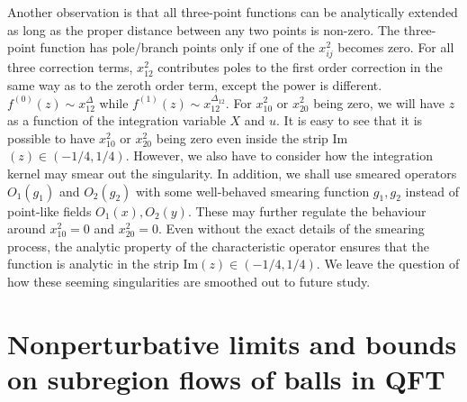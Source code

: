 \documentclass[a4paper,11pt]{article}
\theoremstyle{definition}
\begin{document}
Another observation is that all three-point functions can be analytically extended as long as the proper distance between any two points is non-zero. The three-point function has pole/branch points only if one of the $x_{ij}^2$ becomes zero. For all three correction terms, $x_{12}^2$ contributes poles to the first order correction in the same way as to the zeroth order term, except the power is different. $f^{(0)}(z) \sim x_{12}^{\Delta}$ while $f^{(1)}(z) \sim x_{12}^{\Delta_{12}}$. For $x_{10}^2 $ or $ x_{20}^2$ being zero, we will have $z$ as a function of the integration variable $X$ and $u$. It is easy to see that it is possible to have $x_{10}^2 $ or $ x_{20}^2$ being zero even inside the strip Im$(z) \in (-1/4,1/4)$. However, we also have to consider how the integration kernel may smear out the singularity. In addition, we shall use smeared operators $O_1(g_1)$ and $O_2(g_2)$ with some well-behaved smearing function $g_1,g_2$ instead of point-like fields $O_1(x), O_2(y)$. These may further regulate the behaviour around $x_{10}^2 = 0$ and $x_{20}^2=0$. Even without the exact details of the smearing process, the analytic property of the characteristic operator ensures that the function is analytic in the strip Im$(z) \in (-1/4,1/4)$. We leave the question of how these seeming singularities are smoothed out to future study. 






\section{Nonperturbative limits and bounds on subregion flows of balls in QFT}\label{section:approx}
\end{document}
